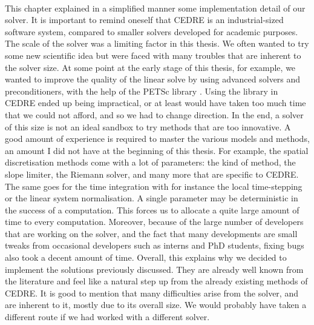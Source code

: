   \paragraph{}
  This chapter explained in a simplified manner some implementation detail of our solver.
  It is important to remind oneself that CEDRE is an industrial-sized software system, compared to smaller solvers developed for academic purposes.
  The scale of the solver was a limiting factor in this thesis.
  We often wanted to try some new scientific idea but were faced with many troubles that are inherent to the solver size.
  At some point at the early stage of this thesis, for example, we wanted to improve the quality of the linear solve by using advanced solvers and preconditioners, with the help of the PETSc library \cite{petsc-web-page, petsc-user-ref, petsc-efficient}.
  Using the library in CEDRE ended up being impractical, or at least would have taken too much time that we could not afford, and so we had to change direction.
  In the end, a solver of this size is not an ideal sandbox to try methods that are too innovative.
  A good amount of experience is required to master the various models and methods, an amount I did not have at the beginning of this thesis.
  For example, the spatial discretisation methods come with a lot of parameters: the kind of method, the slope limiter, the Riemann solver, and many more that are specific to CEDRE.
  The same goes for the time integration with for instance the local time-stepping or the linear system normalisation.
  A single parameter may be deterministic in the success of a computation.
  This forces us to allocate a quite large amount of time to every computation.
  Moreover, because of the large number of developers that are working on the solver, and the fact that many developments are small tweaks from occasional developers such as interns and PhD students, fixing bugs also took a decent amount of time.
  Overall, this explains why we decided to implement the solutions previously discussed.
  They are already well known from the literature and feel like a natural step up from the already existing methods of CEDRE.
  It is good to mention that many difficulties arise from the solver, and are inherent to it, mostly due to its overall size.
  We would probably have taken a different route if we had worked with a different solver.


